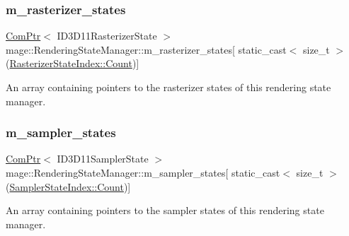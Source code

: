 \subsubsection{\texorpdfstring{m\+\_\+rasterizer\+\_\+states}{m\_rasterizer\_states}}
{\footnotesize\ttfamily \hyperlink{namespacemage_ae74f374780900893caa5555d1031fd79}{Com\+Ptr}$<$ I\+D3\+D11\+Rasterizer\+State $>$ mage\+::\+Rendering\+State\+Manager\+::m\+\_\+rasterizer\+\_\+states\mbox{[} static\+\_\+cast$<$ size\+\_\+t $>$(\hyperlink{classmage_1_1_rendering_state_manager_a72211dd35c1d3968717147572ca127daae93f994f01c537c4e2f7d8528c3eb5e9}{Rasterizer\+State\+Index\+::\+Count})\mbox{]}\hspace{0.3cm}{\ttfamily [private]}}

An array containing pointers to the rasterizer states of this rendering state manager. \hypertarget{classmage_1_1_rendering_state_manager_ae486a0cc711b5b02af4364a3f7184ccd}{}\label{classmage_1_1_rendering_state_manager_ae486a0cc711b5b02af4364a3f7184ccd} 
\subsubsection{\texorpdfstring{m\+\_\+sampler\+\_\+states}{m\_sampler\_states}}
{\footnotesize\ttfamily \hyperlink{namespacemage_ae74f374780900893caa5555d1031fd79}{Com\+Ptr}$<$ I\+D3\+D11\+Sampler\+State $>$ mage\+::\+Rendering\+State\+Manager\+::m\+\_\+sampler\+\_\+states\mbox{[} static\+\_\+cast$<$ size\+\_\+t $>$(\hyperlink{classmage_1_1_rendering_state_manager_ad756bcfaf65de7ce2a7ac46e0ba97557ae93f994f01c537c4e2f7d8528c3eb5e9}{Sampler\+State\+Index\+::\+Count})\mbox{]}\hspace{0.3cm}{\ttfamily [private]}}

An array containing pointers to the sampler states of this rendering state manager. 